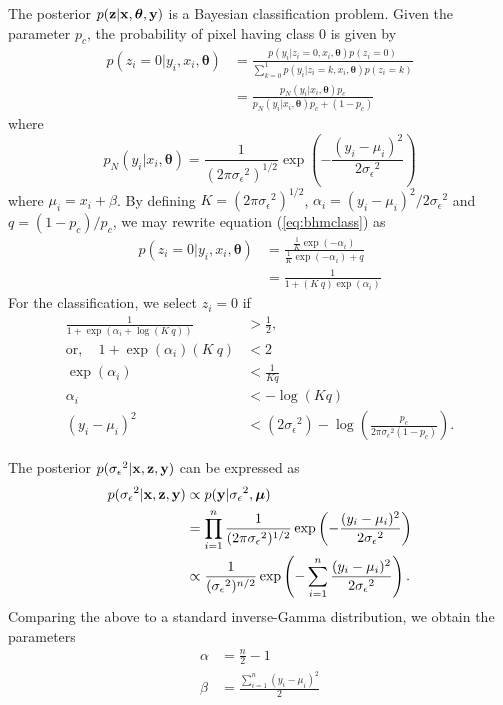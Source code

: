 \documentclass[a4paper,10pt]{article}
\def\bx{{\bf x}}
\def\by{{\bf y}}
\def\bz{{\bf z}}
\def\btheta{{\boldsymbol \theta}}
\def\bmu{{\boldsymbol \mu}}
\def\sigmaeps{{\sigma_{\epsilon}}}
\begin{document}
The posterior $p(\bz|\bx,\btheta,\by)$ is a Bayesian classification problem. Given the parameter $p_c$, the probability of pixel having class 0 is given by
\begin{align}
 p(z_i = 0| y_i, x_i, \btheta) &= \frac{p(y_i|z_i = 0, x_i, \btheta) p(z_i = 0)}{\sum_{k = 0}^1 p(y_i|z_i = k, x_i, \btheta) p(z_i = k)} \nonumber \\
 &= \frac{p_N(y_i|x_i,\btheta) p_c}{p_N(y_i|x_i,\btheta) p_c + (1-p_c)}
 \label{eq:bhmclass}
\end{align}
where
\begin{equation}
 p_N(y_i|x_i,\btheta) = \frac{1}{(2\pi \sigmaeps^2)^{1/2}} \exp\left( - \frac{(y_i - \mu_i)^2}{2\sigmaeps^2} \right)
\end{equation}
where $\mu_i = x_i + \beta$. By defining $K = (2\pi\sigmaeps^2)^{1/2}$, $\alpha_i = (y_i - \mu_i)^2/2\sigmaeps^2$ and $q = (1-p_c)/p_c$, we may rewrite equation (\ref{eq:bhmclass}) as
\begin{align}
 p(z_i = 0| y_i, x_i, \btheta) &= \frac{\frac{1}{K} \exp(-\alpha_i)}{\frac{1}{K}\exp(-\alpha_i) + q} \nonumber \\
                               &= \frac{1}{1 + (K~q) \exp(\alpha_i)}
\end{align}
For the classification, we select $z_i = 0$ if
\begin{align}
 \frac{1}{1 + \exp(\alpha_i + \log(K~q))} &> \frac{1}{2}, \nonumber \\
 \mathrm{or, }\quad 1 + \exp(\alpha_i) (K~q) &< 2 \nonumber \\
 \exp(\alpha_i) &< \frac{1}{Kq} \nonumber \\
 \alpha_i &< -\log(Kq) \nonumber \\
 (y_i - \mu_i)^2 &< (2\sigmaeps^2) - \log\left( \frac{p_c}{2\pi \sigmaeps^2 (1-p_c)} \right).
 \label{eq:classification}
\end{align}

The posterior $p(\sigmaeps^2|\bx,\bz,\by)$ can be expressed as
\begin{align}
 p(\sigmaeps^2|\bx,\bz,\by) &\propto p(\by|\sigmaeps^2, \bmu) \nonumber \\
 &= \prod_{i=1}^n \frac{1}{(2\pi \sigmaeps^2)^{1/2}} \exp \left( -\frac{(y_i - \mu_i)^2}{2\sigmaeps^2} \right) \nonumber \\
 &\propto \frac{1}{(\sigmaeps^2)^{n/2}} \exp \left(- \sum_{i=1}^n \frac{(y_i - \mu_i)^2}{2\sigmaeps^2} \right).
\end{align}
Comparing the above to a standard inverse-Gamma distribution, we obtain the parameters
\begin{align}
 \alpha &= \frac{n}{2}-1 \nonumber \\
 \beta &= \frac{\sum_{i=1}^n(y_i - \mu_i)^2}{2}
\end{align}
\end{document}
